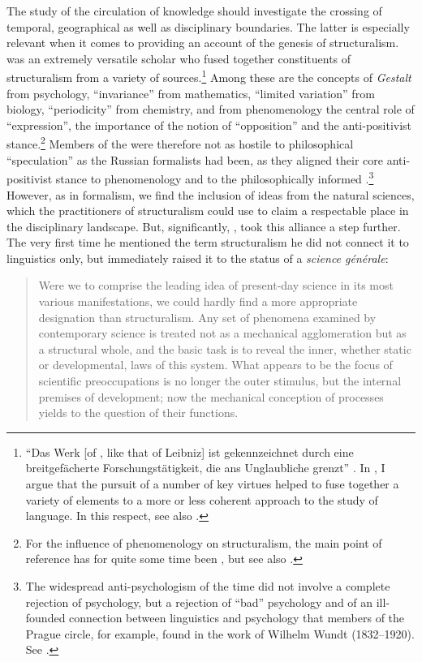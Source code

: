 \documentclass[output=paper]{langscibook}
\begin{document}
The study of the circulation of knowledge should investigate the crossing of temporal, geographical as well as disciplinary boundaries. The latter is especially relevant when it comes to providing an account of the genesis of structuralism. {\Jakobson} was an extremely versatile scholar who fused together constituents of structuralism from a variety of sources.\footnote{``Das Werk [of {\Jakobson}, like that of Leibniz] ist gekennzeichnet durch eine breitgefächerte Forschungstätigkeit, die ans Unglaubliche grenzt'' \citep[17]{Holenstein1975}. In \citet{Karstens2017lonely}, I argue that the pursuit of a number of key virtues helped {\Jakobson} to fuse together a variety of elements to a more or less coherent approach to the study of language. In this respect, see also \citet{Karstens2017blog}.} Among these are the concepts of \emph{Gestalt} from psychology, ``invariance'' from mathematics, ``limited variation'' from biology, ``periodicity'' from chemistry, and from phenomenology the central role of ``expression'', the importance of the notion of ``opposition'' and the anti-positivist stance.\footnote{For the influence of phenomenology on structuralism, the main point of reference has for quite some time been \citet{Holenstein1975}, but see also \citet{Flack2016}.} Members of the {\PragueSchool} were therefore not as hostile to philosophical ``speculation'' as the Russian formalists had been, as they aligned their core anti-positivist stance to phenomenology and to the philosophically informed .\footnote{The widespread anti-psychologism of the time did not involve a complete rejection of psychology, but a rejection of ``bad'' psychology and of an ill-founded connection between linguistics and psychology that members of the Prague circle, for example, found in the work of Wilhelm Wundt (1832--1920). See \citet[139]{Toman1995}.} However, as in formalism, we find the inclusion of ideas from the natural sciences, which the practitioners of structuralism could use to claim a respectable place in the disciplinary landscape. But, significantly, {\Jakobson}, took this alliance a step further. The very first time he mentioned the term structuralism he did not connect it to linguistics only, but immediately raised it to the status of a \emph{science générale}:

\begin{quotation}
Were we to comprise the leading idea of present-day science in its most various manifestations, we could hardly find a more appropriate designation than structuralism. Any set of phenomena examined by contemporary science is treated not as a mechanical agglomeration but as a structural whole, and the basic task is to reveal the inner, whether static or developmental, laws of this system. What appears to be the focus of scientific preoccupations is no longer the outer stimulus, but the internal premises of development; now the mechanical conception of processes yields to the question of their functions. \citep[11]{Jakobson1929}
\end{quotation}
\end{document}
